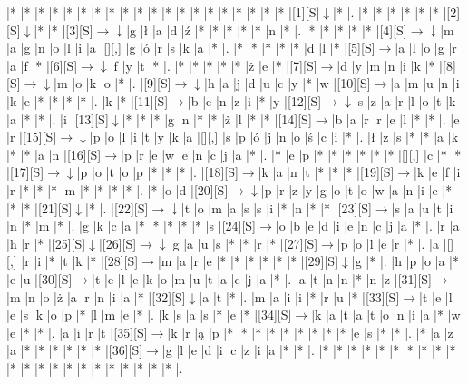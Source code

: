 \documentclass[11pt]{article}
\newcommand\drarr{$\rightarrow \!\!\!\!\! \downarrow$}
\newcommand\rarr{$\rightarrow$}
\newcommand\darr{$\downarrow$}
\begin{document}
\noindent\begin{Puzzle}{21}{23}|*	|*	|*	|*	|*	|*	|*	|*	|*	|*	|*	|*	|*	|*	|*	|*	|*	|*	|*	|*	|[1][S]\darr	|*	|.
|*	|*	|*	|*	|*	|*	|[2][S]\darr	|*	|*	|[3][S]\drarr	|g	|ł	|a	|d	|ź	|*	|*	|*	|*	|*	|n	|*	|.
|*	|*	|*	|*	|*	|[4][S]\drarr	|m	|a	|g	|n	|o	|l	|i	|a	|[][,]{ }	|g	|ó	|r	|s	|k	|a	|*	|.
|*	|*	|*	|*	|*	|d	|l	|*	|[5][S]\rarr	|a	|l	|o	|g	|r	|a	|f	|*	|[6][S]\drarr	|f	|y	|t	|*	|.
|*	|*	|*	|*	|*	|ż	|e	|*	|[7][S]\rarr	|d	|y	|m	|n	|i	|k	|*	|[8][S]\drarr	|m	|o	|k	|o	|*	|.
|[9][S]\drarr	|h	|a	|j	|d	|u	|c	|y	|*	|w	|[10][S]\rarr	|a	|m	|u	|n	|i	|k	|e	|*	|*	|*	|*	|.
|k	|*	|[11][S]\rarr	|b	|e	|n	|z	|i	|*	|y	|[12][S]\drarr	|s	|z	|a	|r	|l	|o	|t	|k	|a	|*	|*	|.
|i	|[13][S]\darr	|*	|*	|*	|g	|n	|*	|*	|ż	|l	|*	|*	|[14][S]\rarr	|b	|a	|r	|r	|e	|l	|*	|*	|.
|e	|r	|[15][S]\drarr	|p	|o	|l	|i	|t	|y	|k	|a	|[][,]{ }	|s	|p	|ó	|j	|n	|o	|ś	|c	|i	|*	|.
|ł	|z	|s	|*	|*	|a	|k	|*	|*	|a	|n	|[16][S]\rarr	|p	|r	|e	|w	|e	|n	|c	|j	|a	|*	|.
|*	|e	|p	|*	|*	|*	|*	|*	|*	|[][,]{ }	|c	|*	|*	|[17][S]\drarr	|p	|o	|t	|o	|p	|*	|*	|*	|.
|[18][S]\rarr	|k	|a	|n	|t	|*	|*	|*	|[19][S]\rarr	|k	|e	|f	|i	|r	|*	|*	|*	|m	|*	|*	|*	|*	|.
|*	|o	|d	|[20][S]\drarr	|p	|r	|z	|y	|g	|o	|t	|o	|w	|a	|n	|i	|e	|*	|*	|*	|[21][S]\darr	|*	|.
|[22][S]\drarr	|t	|o	|m	|a	|s	|s	|i	|*	|n	|*	|*	|[23][S]\rarr	|s	|a	|u	|t	|i	|n	|*	|m	|*	|.
|g	|k	|c	|a	|*	|*	|*	|*	|*	|s	|[24][S]\rarr	|o	|b	|e	|d	|i	|e	|n	|c	|j	|a	|*	|.
|r	|a	|h	|r	|*	|[25][S]\darr	|[26][S]\drarr	|g	|a	|u	|s	|*	|*	|r	|*	|[27][S]\rarr	|p	|o	|l	|e	|r	|*	|.
|a	|[][,]{ }	|r	|i	|*	|t	|k	|*	|[28][S]\rarr	|m	|a	|r	|e	|*	|*	|*	|*	|*	|*	|[29][S]\darr	|g	|*	|.
|h	|p	|o	|a	|*	|e	|u	|[30][S]\rarr	|t	|e	|l	|e	|k	|o	|m	|u	|t	|a	|c	|j	|a	|*	|.
|a	|t	|n	|n	|*	|n	|z	|[31][S]\rarr	|m	|n	|o	|ż	|a	|r	|n	|i	|a	|*	|[32][S]\darr	|a	|t	|*	|.
|m	|a	|i	|i	|*	|r	|u	|*	|[33][S]\rarr	|t	|e	|l	|e	|s	|k	|o	|p	|*	|l	|m	|e	|*	|.
|k	|s	|a	|s	|*	|e	|*	|[34][S]\rarr	|k	|a	|t	|a	|t	|o	|n	|i	|a	|*	|w	|e	|*	|*	|.
|a	|i	|r	|t	|[35][S]\rarr	|k	|r	|ą	|p	|*	|*	|*	|*	|*	|*	|*	|*	|*	|e	|s	|*	|*	|.
|*	|a	|z	|a	|*	|*	|*	|*	|*	|*	|[36][S]\rarr	|g	|l	|e	|d	|i	|c	|z	|i	|a	|*	|*	|.
|*	|*	|*	|*	|*	|*	|*	|*	|*	|*	|*	|*	|*	|*	|*	|*	|*	|*	|*	|*	|*	|*	|.\end{Puzzle}

\newpage
\end{document}
